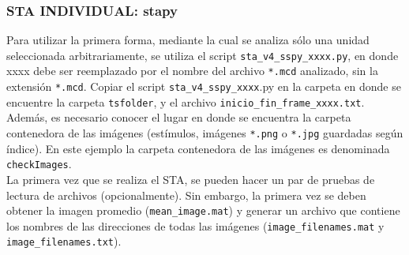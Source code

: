 \documentclass[10pt]{article}
\begin{document}
\subsubsection{ STA INDIVIDUAL: stapy}
	
Para utilizar la primera forma, mediante la cual se analiza sólo una unidad seleccionada arbitrariamente, se utiliza el script 
\verb+sta_v4_sspy_xxxx.py+, 
en donde xxxx debe ser reemplazado por el nombre del archivo \verb+*.mcd+ analizado, sin la extensión \verb+*.mcd+. Copiar el script \verb+sta_v4_sspy_xxxx+.py en la carpeta en donde se encuentre la carpeta \verb+tsfolder+, y el archivo \verb+inicio_fin_frame_xxxx.txt+. Además, es necesario conocer el lugar en donde se encuentra la carpeta contenedora de las imágenes (estímulos, imágenes \verb+*.png+ o \verb+*.jpg+ guardadas según índice). En este ejemplo la carpeta contenedora de las imágenes es denominada \verb+checkImages+.\\

La primera vez que se realiza el STA, se pueden hacer un par de pruebas de lectura de archivos (opcionalmente). Sin embargo, la primera vez se deben obtener la imagen promedio (\verb+mean_image.mat+) y generar un archivo que contiene los nombres de las direcciones de todas las imágenes (\verb+image_filenames.mat+ y \verb+image_filenames.txt+). \\
\end{document}
